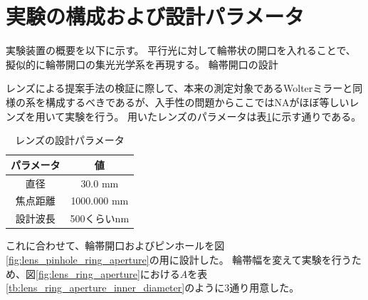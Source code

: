 \documentclass[dvipdfmx,autodetect-engine]{jreport}
\begin{document}
\newpage
\section{実験の構成および設計パラメータ}
実験装置の概要を以下に示す。
平行光に対して輪帯状の開口を入れることで、擬似的に輪帯開口の集光光学系を再現する。
輪帯開口の設計

レンズによる提案手法の検証に際して、本来の測定対象であるWolterミラーと同様の系を構成するべきであるが、入手性の問題からここではNAがほぼ等しいレンズを用いて実験を行う。
用いたレンズのパラメータは表\ref{tb:focusing_lens_params}に示す通りである。

\begin{table}
\begin{center}
  \begin{tabular}{|c|c|} \hline
    パラメータ & 値 \\ \hline
    直径 & 30.0 mm  \\
    焦点距離 & 1000.000 mm \\
    設計波長 & 500くらいnm \\ \hline
  \end{tabular}
  \label{tb:focusing_lens_params}
  \caption{レンズの設計パラメータ}
\end{center}
\end{table}

これに合わせて、輪帯開口およびピンホールを図\ref{fig:lens_pinhole_ring_aperture}の用に設計した。
輪帯幅を変えて実験を行うため、図\ref{fig:lens_ring_aperture}における$A$を表\ref{tb:lens_ring_aperture_inner_diameter}のように3通り用意した。
\end{document}

